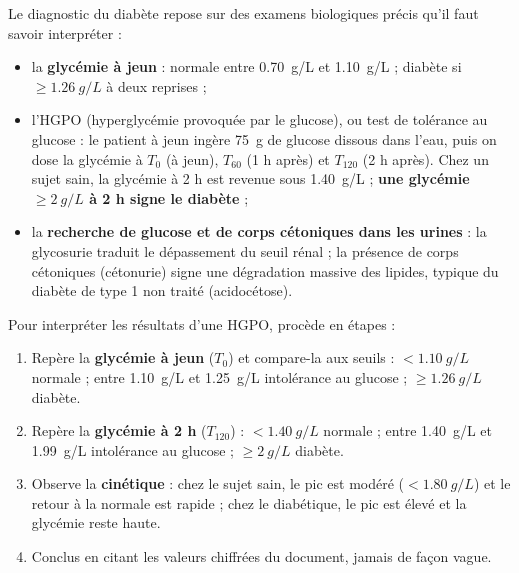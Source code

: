 \documentclass[11pt]{article}
\newcommand{\cle}[1]{{\popxbold\color{popdark}#1}}
\begin{document}
Le diagnostic du diabète repose sur des examens biologiques précis qu'il faut savoir interpréter :

\begin{itemize}
\item la \textbf{glycémie à jeun} : normale entre \SI{0,70}{g/L} et \SI{1,10}{g/L} ; diabète si $\geq \SI{1,26}{g/L}$ à deux reprises ;
\item l'\cle{HGPO} (hyperglycémie provoquée par le glucose), ou test de tolérance au glucose : le patient à jeun ingère \SI{75}{g} de glucose dissous dans l'eau, puis on dose la glycémie à $T_0$ (à jeun), $T_{60}$ (1 h après) et $T_{120}$ (2 h après). Chez un sujet sain, la glycémie à 2 h est revenue sous \SI{1,40}{g/L} ; \textbf{une glycémie $\geq \SI{2}{g/L}$ à 2 h signe le diabète} ;
\item la \textbf{recherche de glucose et de corps cétoniques dans les urines} : la glycosurie traduit le dépassement du seuil rénal ; la présence de corps cétoniques (cétonurie) signe une dégradation massive des lipides, typique du diabète de type 1 non traité (acidocétose).
\end{itemize}

\begin{methode}
Pour interpréter les résultats d'une HGPO, procède en étapes :
\begin{enumerate}
\item Repère la \textbf{glycémie à jeun} ($T_0$) et compare-la aux seuils : $< \SI{1,10}{g/L}$ normale ; entre \SI{1,10}{g/L} et \SI{1,25}{g/L} intolérance au glucose ; $\geq \SI{1,26}{g/L}$ diabète.
\item Repère la \textbf{glycémie à 2 h} ($T_{120}$) : $< \SI{1,40}{g/L}$ normale ; entre \SI{1,40}{g/L} et \SI{1,99}{g/L} intolérance au glucose ; $\geq \SI{2}{g/L}$ diabète.
\item Observe la \textbf{cinétique} : chez le sujet sain, le pic est modéré ($< \SI{1,80}{g/L}$) et le retour à la normale est rapide ; chez le diabétique, le pic est élevé et la glycémie reste haute.
\item Conclus en citant les valeurs chiffrées du document, jamais de façon vague.
\end{enumerate}
\end{methode}
\end{document}
